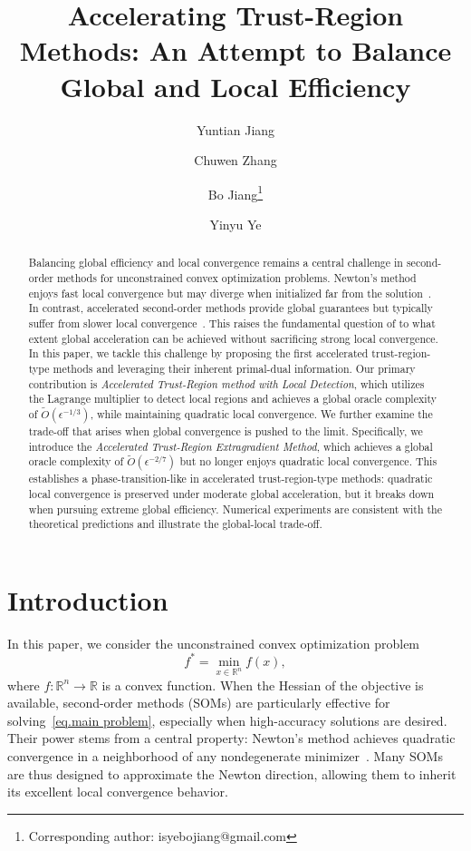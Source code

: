\documentclass{article}
\author[1]{\small Yuntian Jiang}
\author[2]{\small Chuwen Zhang}
\author[1]{\small Bo Jiang\thanks{Corresponding author: isyebojiang@gmail.com}}
\author[3]{\small Yinyu Ye}
\affil[1]{\footnotesize School of Information Management and Engineering\\ Shanghai University of Finance and Economics}
\affil[2]{\footnotesize Booth School of Business\\ University of Chicago}
\affil[3]{\footnotesize Antai College of Economics and Management\\ Shanghai Jiao Tong University}
\title{Accelerating Trust-Region Methods: An Attempt to Balance Global and Local Efficiency}
\begin{document}
\maketitle
\begin{abstract}
    Balancing global efficiency and local convergence remains a central challenge in second-order methods for unconstrained convex optimization problems. Newton’s method enjoys fast local convergence but may diverge when initialized far from the solution~\cite{more1982newton,dennisjr1996numerical}. In contrast, accelerated second-order methods provide global guarantees but typically suffer from slower local convergence~\cite{carmon2022optimal,chen2022accelerating,jiang2020unified}. This raises the fundamental question of to what extent global acceleration can be achieved without sacrificing strong local convergence. In this paper, we tackle this challenge by proposing the first accelerated trust-region-type methods and leveraging their inherent primal-dual information. Our primary contribution is \emph{Accelerated Trust-Region method with Local Detection}, which utilizes the Lagrange multiplier to detect local regions and achieves a global oracle complexity of $\tilde{O}(\epsilon^{-1/3})$, while maintaining quadratic local convergence. We further examine the trade-off that arises when global convergence is pushed to the limit. Specifically, we introduce the \emph{Accelerated Trust-Region Extragradient Method}, which achieves a global oracle complexity of $\tilde{O}(\epsilon^{-2/7})$ but no longer enjoys quadratic local convergence. This establishes a phase-transition-like in accelerated trust-region-type methods: quadratic local convergence is preserved under moderate global acceleration, but it breaks down when pursuing extreme global efficiency. Numerical experiments are consistent with the theoretical predictions and illustrate the global-local trade-off.
\end{abstract}

\section{Introduction}\label{Intro}
In this paper, we consider the unconstrained convex optimization problem
\begin{equation} \label{eq.main problem}
    f^* = \min_{x\in \mathbb{R}^n} f(x),
\end{equation}
where $f:\mathbb{R}^n \to \mathbb{R}$ is a convex function.
When the Hessian of the objective is available, second-order methods (SOMs) are particularly effective for solving~\eqref{eq.main problem}, especially when high-accuracy solutions are desired. Their power stems from a central property: Newton’s method achieves quadratic convergence in a neighborhood of any nondegenerate minimizer~\cite{polyak2007newton,more1982newton,nocedal1999numerical}. Many SOMs are thus designed to approximate the Newton direction, allowing them to inherit its excellent local convergence behavior.
\end{document}
